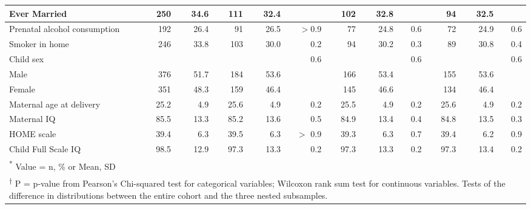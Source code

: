 {\begin{landscape}
\begin{table}
\begin{tabular}{l|rr|rrr|rrr|rrr}
\hspace{1em}Ever Married & 250 & 34.6 & 111 & 32.4 && 102 & 32.8 && 94 & 32.5 & \\
\hline
Prenatal alcohol consumption & 192 & 26.4 & 91 & 26.5 & $>$0.9 & 77 & 24.8 & 0.6 & 72 & 24.9 & 0.6 \\
\hline
Smoker in home & 246 & 33.8 & 103 & 30.0 & 0.2 & 94 & 30.2 & 0.3 & 89 & 30.8 & 0.4 \\
\hline
Child sex & & & & & 0.6 & & & 0.6 & & & 0.6 \\
\hspace{1em}Male & 376 & 51.7 & 184 & 53.6 && 166 & 53.4 && 155 & 53.6 & \\
\hspace{1em}Female & 351 & 48.3 & 159 & 46.4 && 145 & 46.6 && 134 & 46.4 & \\
\hline
Maternal age at delivery & 25.2 & 4.9 & 25.6 & 4.9 & 0.2 & 25.5 & 4.9 & 0.2 & 25.6 & 4.9 & 0.2\\
\hline
Maternal IQ & 85.5 & 13.3 & 85.2 & 13.6 & 0.5 & 84.9 & 13.4 & 0.4 & 84.8 & 13.5 & 0.3 \\
\hline
HOME scale & 39.4 & 6.3 & 39.5 & 6.3 & $>$ 0.9 & 39.3 & 6.3 & 0.7 & 39.4 & 6.2 & 0.9\\
\hline
Child Full Scale IQ & 98.5 & 12.9 & 97.3 & 13.3 & 0.2 & 97.3 & 13.3 & 0.2 & 97.3 & 13.4 & 0.2\\
\hline
\multicolumn{12}{l}{\rule{0pt}{1em}\textsuperscript{*} Value = n, \% or Mean, SD}\\
\multicolumn{12}{p{21cm}}{\rule{0pt}{1em}\textsuperscript{$\dagger$} P = p-value from Pearson's Chi-squared test for categorical variables; Wilcoxon rank sum test for continuous variables. Tests of the difference in distributions between the entire cohort and the three nested subsamples.} \\
\end{tabular}
\end{table}
\endgroup
\end{landscape}


}
